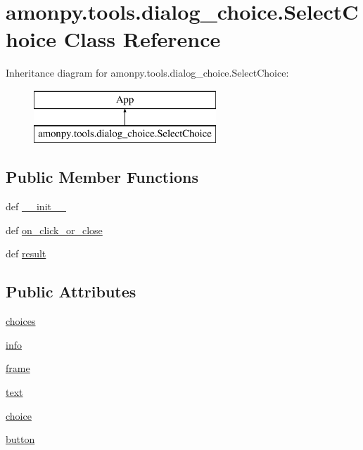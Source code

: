 \hypertarget{classamonpy_1_1tools_1_1dialog__choice_1_1_select_choice}{\section{amonpy.\-tools.\-dialog\-\_\-choice.\-Select\-Choice Class Reference}
\label{classamonpy_1_1tools_1_1dialog__choice_1_1_select_choice}
}
Inheritance diagram for amonpy.\-tools.\-dialog\-\_\-choice.\-Select\-Choice\-:\begin{figure}[H]
\begin{center}
\leavevmode
\includegraphics[height=2.000000cm]{d5/d6e/classamonpy_1_1tools_1_1dialog__choice_1_1_select_choice}
\end{center}
\end{figure}
\subsection*{Public Member Functions}
\begin{DoxyCompactItemize}
\item 
def \hyperlink{classamonpy_1_1tools_1_1dialog__choice_1_1_select_choice_a9ffb7fd1e40656e936f4485e5c3b3c6e}{\-\_\-\-\_\-init\-\_\-\-\_\-}
\item 
def \hyperlink{classamonpy_1_1tools_1_1dialog__choice_1_1_select_choice_ac31e6372528c3039e831163f6e6bb939}{on\-\_\-click\-\_\-or\-\_\-close}
\item 
def \hyperlink{classamonpy_1_1tools_1_1dialog__choice_1_1_select_choice_a8bca0cecf2d89c6936849f69671d9945}{result}
\end{DoxyCompactItemize}
\subsection*{Public Attributes}
\begin{DoxyCompactItemize}
\item 
\hyperlink{classamonpy_1_1tools_1_1dialog__choice_1_1_select_choice_a8363438c3e75f765ca4b2c98eaf26699}{choices}
\item 
\hyperlink{classamonpy_1_1tools_1_1dialog__choice_1_1_select_choice_ab2d0390c17c73e14838add2d52d0f73d}{info}
\item 
\hyperlink{classamonpy_1_1tools_1_1dialog__choice_1_1_select_choice_a177ab137db91d1da6fa02abc917efe06}{frame}
\item 
\hyperlink{classamonpy_1_1tools_1_1dialog__choice_1_1_select_choice_a7823bcbaf7fa0bac5c175828edb1fc67}{text}
\item 
\hyperlink{classamonpy_1_1tools_1_1dialog__choice_1_1_select_choice_a403bd725ee5183ba2cd5134d05b7af61}{choice}
\item 
\hyperlink{classamonpy_1_1tools_1_1dialog__choice_1_1_select_choice_ac385a7d49dee6e1be82e148d22a64717}{button}
\end{DoxyCompactItemize}


